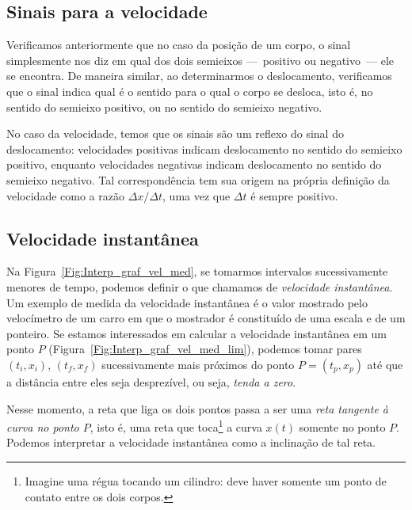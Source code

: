 \subsection{Sinais para a velocidade}

Verificamos anteriormente que no caso da posição de um corpo, o sinal simplesmente nos diz em qual dos dois semieixos ---~positivo ou negativo~--- ele se encontra. De maneira similar, ao determinarmos o deslocamento, verificamos que o sinal indica qual é o sentido para o qual o corpo se desloca, isto é, no sentido do semieixo positivo, ou no sentido do semieixo negativo.

No caso da velocidade, temos que os sinais são um reflexo do sinal do deslocamento: velocidades positivas indicam deslocamento no sentido do semieixo positivo, enquanto velocidades negativas indicam deslocamento no sentido do semieixo negativo. Tal correspondência tem sua origem na própria definição da velocidade como a razão $\Delta x / \Delta t$, uma vez que $\Delta t$ é sempre positivo.

\subsection{Velocidade instantânea}

Na Figura~\ref{Fig:Interp_graf_vel_med}, se tomarmos intervalos sucessivamente menores de tempo, podemos definir o que chamamos de \emph{velocidade instantânea}. Um exemplo de medida da velocidade instantânea é o valor mostrado pelo velocímetro de um carro em que o mostrador é constituído de uma escala e de um ponteiro. Se estamos interessados em calcular a velocidade instantânea em um ponto $P$ (Figura~\ref{Fig:Interp_graf_vel_med_lim}), podemos tomar pares $(t_i, x_i)$, $(t_f, x_f)$ sucessivamente mais próximos do ponto $P = (t_p,x_p)$ até que a distância entre eles seja desprezível, ou seja, \emph{tenda a zero}.

Nesse momento, a reta que liga os dois pontos passa a ser uma \emph{reta tangente à curva no ponto $P$}, isto é, uma reta que toca\footnote[][-4cm]{Imagine uma régua tocando um cilindro: deve haver somente um ponto de contato entre os dois corpos.} a curva $x(t)$ somente no ponto $P$. Podemos interpretar a velocidade instantânea como a inclinação de tal reta.

